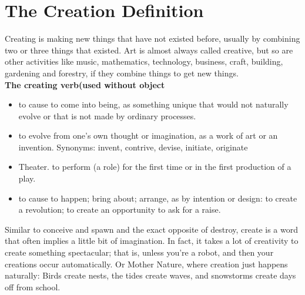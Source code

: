 \documentclass[6pt,a4paper]{report}
\begin{document}
\section*{The Creation Definition} 
Creating is making new things that have not existed before, usually by combining two or three things that existed. Art is almost always called creative, but so are other activities like music, mathematics, technology, business, craft, building, gardening and forestry, if they combine things to get new things. \\
\textbf{The creating verb(used without object} \\
\begin{itemize} 
\item to cause to come into being, as something unique that would not naturally evolve or that is not made by ordinary processes. 
\item to evolve from one's own thought or imagination, as a work of art or an invention.
Synonyms: invent, contrive, devise, initiate, originate
\item Theater. to perform (a role) for the first time or in the first production of a play. 
\item to cause to happen; bring about; arrange, as by intention or design:
to create a revolution; to create an opportunity to ask for a raise.
\end{itemize} 
Similar to conceive and spawn and the exact opposite of destroy, create is a word that often implies a little bit of imagination. In fact, it takes a lot of creativity to create something spectacular; that is, unless you're a robot, and then your creations occur automatically. Or Mother Nature, where creation just happens naturally: Birds create nests, the tides create waves, and snowstorms create days off from school. \\
\end{document}
